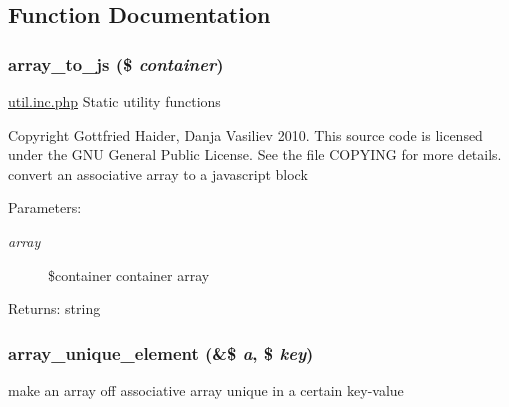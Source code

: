 \subsection{Function Documentation}
\hypertarget{util_8inc_8php_61d3b2881d9368741c71509017724bc8}{
\subsubsection[{array\_\-to\_\-js}]{\setlength{\rightskip}{0pt plus 5cm}array\_\-to\_\-js (\$ {\em container})}}
\label{util_8inc_8php_61d3b2881d9368741c71509017724bc8}


\hyperlink{util_8inc_8php}{util.inc.php} Static utility functions

Copyright Gottfried Haider, Danja Vasiliev 2010. This source code is licensed under the GNU General Public License. See the file COPYING for more details. convert an associative array to a javascript block

\begin{Desc}
\item[Parameters:]
\begin{description}
\item[{\em array}]\$container container array \end{description}
\end{Desc}
\begin{Desc}
\item[Returns:]string \end{Desc}
\hypertarget{util_8inc_8php_4647462c98447c6c2842f70d8c313f85}{
\subsubsection[{array\_\-unique\_\-element}]{\setlength{\rightskip}{0pt plus 5cm}array\_\-unique\_\-element (\&\$ {\em a}, \/  \$ {\em key})}}
\label{util_8inc_8php_4647462c98447c6c2842f70d8c313f85}


make an array off associative array unique in a certain key-value

